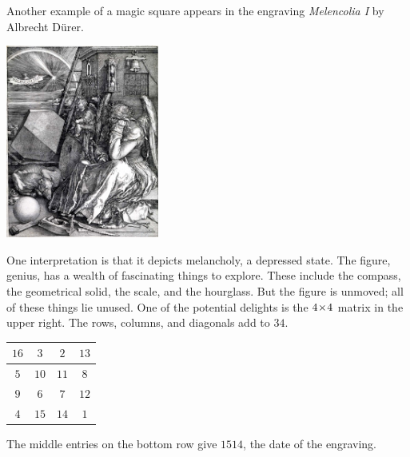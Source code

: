 Another example of a magic square appears in the engraving
\textit{Melencolia I} by Albrecht D\"urer.
\begin{center}
  \includegraphics[height=2.5in]{Melencolia.jpg} %
\end{center}
One interpretation is that it depicts melancholy, a depressed state.
The figure, genius,
has a wealth of fascinating things to explore.
These include
the compass, the geometrical solid, the scale, and the hourglass.
But the figure is unmoved; all of these things lie unused.
One of the potential delights is the $4 \! \times \! 4$ matrix in the upper right.
The rows, columns, and diagonals add to $34$.
\begin{center}
  \qquad
  \begin{tabular}{|c|c|c|c|}
    \hline
      $16$  &$3$  &$2$  &$13$  \\ \hline
      $5$   &$10$ &$11$ &$8$   \\ \hline
      $9$   &$6$  &$7$  &$12$  \\ \hline    
      $4$   &$15$ &$14$ &$1$  \\ \hline  
  \end{tabular}
\end{center}
The middle entries on the bottom row give $1514$, the 
date of the engraving.

